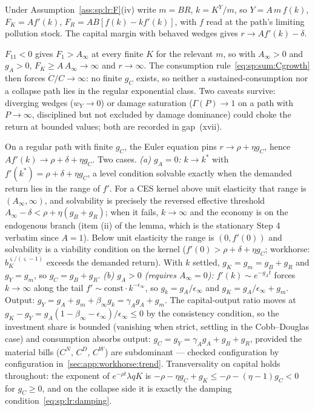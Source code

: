  Under Assumption~\ref{ass:sp:lr:F}(iv) write $m=BR$,
$k=K^Y/m$, so $Y=A\,m\,f\left(k\right)$, $F_K=Af'\left(k\right)$,
$F_R=AB\left[f\left(k\right)-kf'\left(k\right)\right]$, with $f$ read at the path's limiting
pollution stock. The capital margin with behaved wedges gives $r\to Af'\left(k\right)-\delta$.

 $F_{11}<0$ gives
$F_1>A_\infty$ at every finite $K$ for the relevant $m$, so with $A_\infty>0$ and $g_A>0$,
$F_K\ge A\,A_\infty\to\infty$ and $r\to\infty$. The consumption
rule~\eqref{eq:sp:sum:Cgrowth} then forces $\dot C/C\to\infty$: no finite $g_C$ exists, so
neither a sustained-consumption nor a collapse path lies in the regular exponential class.
Two caveats survive: diverging wedges ($w_Y\to0$) or damage saturation
($\Gamma\left(P\right)\to1$ on a path with $P\to\infty$, disciplined but not excluded by
damage dominance) could choke the return at bounded values; both are recorded in gap~(xvii).

 On a regular path
with finite $g_C$, the Euler equation pins $r\to\rho+\eta g_C$, hence
$Af'\left(k\right)\to\rho+\delta+\eta g_C$. Two cases. \emph{(a) $g_A=0$:} $k\to k^*$ with
$f'\left(k^*\right)=\rho+\delta+\eta g_C$, a level condition solvable exactly when the
demanded return lies in the range of $f'$. For a CES kernel above unit elasticity that range
is $\left(A_\infty,\infty\right)$, and solvability is precisely the reversed effective
threshold $A_\infty-\delta<\rho+\eta\left(g_B+g_R\right)$; when it fails, $k\to\infty$ and
the economy is on the endogenous branch (item (ii) of the lemma, which is the stationary
Step 4 verbatim since $A=1$). Below unit elasticity the range is
$\left(0,f'\left(0\right)\right)$ and solvability is a viability condition on the kernel
($f'\left(0\right)>\rho+\delta+\eta g_C$; workhorse: $b_K^{\varsigma/\left(\varsigma-1\right)}$
exceeds the demanded return). With $k$ settled, $g_K=g_m=g_B+g_R$ and
$g_Y=g_m$, so $g_C=g_B+g_R$. \emph{(b) $g_A>0$ (requires $A_\infty=0$):}
$f'\left(k\right)\sim e^{-g_At}$ forces $k\to\infty$ along the tail
$f'\sim\mathrm{const}\cdot k^{-\epsilon_\infty}$, so $g_k=g_A/\epsilon_\infty$ and
$g_K=g_A/\epsilon_\infty+g_m$. Output:
$g_Y=g_A+g_m+\beta_\infty g_k=\gamma_Ag_A+g_m$. The capital-output ratio moves at
$g_K-g_Y=g_A\left(1-\beta_\infty-\epsilon_\infty\right)/\epsilon_\infty\le0$ by the
consistency condition, so the investment share is bounded (vanishing when strict, settling
in the Cobb--Douglas case) and consumption absorbs output: $g_C=g_Y=\gamma_Ag_A+g_B+g_R$,
provided the material bills ($C^N$, $C^D$, $C^W$) are subdominant --- checked configuration
by configuration in~\ref{sec:app:workhorse:trend}. Transversality on capital holds
throughout: the exponent of $e^{-\rho t}\lambda qK$ is
$-\rho-\eta g_C+g_K\le-\rho-\left(\eta-1\right)g_C<0$ for $g_C\ge0$, and on the collapse
side it is exactly the damping condition~\eqref{eq:sp:lr:damping}.

